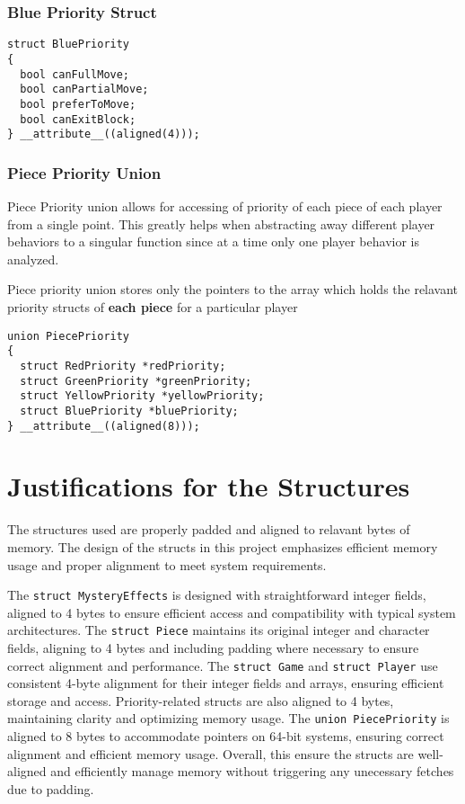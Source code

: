 \documentclass[12pt, a4paper]{report}
\begin{document}
\subsection{Blue Priority Struct}
\begin{lstlisting}
struct BluePriority
{
  bool canFullMove;
  bool canPartialMove;
  bool preferToMove;
  bool canExitBlock;
} __attribute__((aligned(4)));
\end{lstlisting}

\subsection{Piece Priority Union}
Piece Priority union allows for accessing of priority of each piece of each player from a single point. This greatly helps when abstracting away different player behaviors to a singular function since at a time only one player behavior is analyzed. 

Piece priority union stores only the pointers to the array which holds the relavant priority structs of \textbf{each piece} for a particular player

\begin{lstlisting}
union PiecePriority
{
  struct RedPriority *redPriority;
  struct GreenPriority *greenPriority;
  struct YellowPriority *yellowPriority;
  struct BluePriority *bluePriority;
} __attribute__((aligned(8)));
\end{lstlisting}

\chapter{Justifications for the Structures}
The structures used are properly padded and aligned to relavant bytes of memory. The design of the structs in this project emphasizes efficient memory usage and proper alignment to meet system requirements. 

The \lstinline|struct MysteryEffects| is designed with straightforward integer fields, aligned to 4 bytes to ensure efficient access and compatibility with typical system architectures. The \lstinline|struct Piece| maintains its original integer and character fields, aligning to 4 bytes and including padding where necessary to ensure correct alignment and performance. The \lstinline|struct Game| and \lstinline|struct Player| use consistent 4-byte alignment for their integer fields and arrays, ensuring efficient storage and access. Priority-related structs are also aligned to 4 bytes, maintaining clarity and optimizing memory usage. The \lstinline|union PiecePriority| is aligned to 8 bytes to accommodate pointers on 64-bit systems, ensuring correct alignment and efficient memory usage. Overall, this ensure the structs are well-aligned and efficiently manage memory without triggering any unecessary fetches due to padding.
\end{document}
